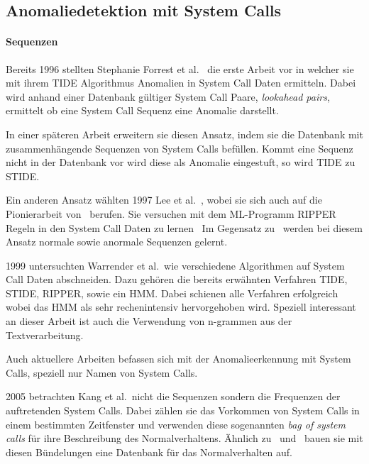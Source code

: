     \subsection{Anomaliedetektion mit System Calls}

    \paragraph{Sequenzen}
        Bereits 1996 stellten Stephanie Forrest et al.~\cite{FORREST} die erste Arbeit vor in welcher sie mit ihrem \ac{TIDE} Algorithmus Anomalien in System Call Daten ermitteln.
        Dabei wird anhand einer Datenbank gültiger System Call Paare, \textit{lookahead pairs}, ermittelt ob eine System Call Sequenz eine Anomalie darstellt.

        In einer späteren Arbeit erweitern sie diesen Ansatz, indem sie die Datenbank mit zusammenhängende Sequenzen von System Calls befüllen.
        Kommt eine Sequenz nicht in der Datenbank vor wird diese als Anomalie eingestuft, so wird \ac{TIDE} zu \ac{STIDE}.~\cite{STIDE}

        Ein anderen Ansatz wählten 1997 Lee et al.~\cite{LEE1997}, wobei sie sich auch auf die Pionierarbeit von~\cite{FORREST} berufen.
        Sie versuchen mit dem \ac{ML}-Programm \ac{RIPPER} Regeln in den System Call Daten zu lernen~\cite{LEE1997}
        Im Gegensatz zu~\cite{FORREST} werden bei diesem Ansatz normale sowie anormale Sequenzen gelernt.

        1999 untersuchten Warrender et al.\ wie verschiedene Algorithmen auf System Call Daten abschneiden.
        Dazu gehören die bereits erwähnten Verfahren \ac{TIDE}, \ac{STIDE}, \ac{RIPPER}, sowie ein \ac{HMM}.
        Dabei schienen alle Verfahren erfolgreich wobei das \ac{HMM} als sehr rechenintensiv hervorgehoben wird.
        Speziell interessant an dieser Arbeit ist auch die Verwendung von n-grammen aus der Textverarbeitung.~\cite{STIDE_Alternatives}
 
        Auch aktuellere Arbeiten befassen sich mit der Anomalieerkennung mit System Calls, {\color{red} speziell nur Namen von System Calls}.
    
        2005 betrachten Kang et al.\ nicht die Sequenzen sondern die Frequenzen der auftretenden System Calls.
        Dabei zählen sie das Vorkommen von System Calls in einem bestimmten Zeitfenster und verwenden diese sogenannten \textit{bag of system calls} für ihre Beschreibung des Normalverhaltens.
        Ähnlich zu~\cite{FORREST} und~\cite{STIDE} bauen sie mit diesen Bündelungen eine Datenbank für das Normalverhalten auf.~\cite{FREQUENCY2}

